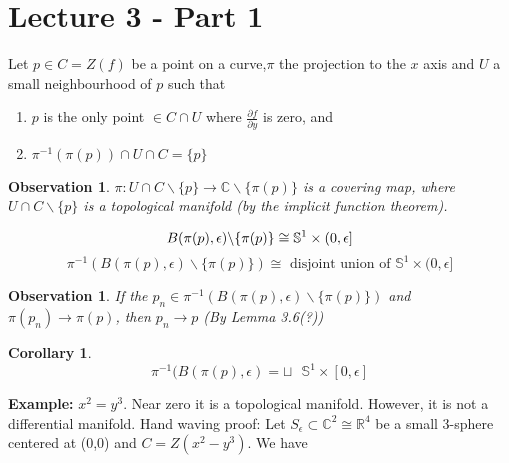 \documentclass[12pt]{article}
\newtheorem{corollary}[theorem]{Corollary}
\newtheorem{observation}[theorem]{Observation}
\theoremstyle{remark}
\begin{document}
\section{Lecture 3 - Part 1}

Let $p\in C=Z(f)$ be a point on a curve,$\pi$ the projection to the $x$ axis and $U$ a small neighbourhood of $p$ such that

\begin{enumerate}

    \item $p$ is  the only point $\in C\cap U$ where $\frac{\partial f}{\partial y}$ is zero, and

    \item $\pi^{-1}(\pi (p))\cap U\cap C = \{p\}$

\end{enumerate}

\begin{observation}

$\pi: U\cap C\backslash \{p\}\rightarrow \mathbb{C}\backslash \{\pi(p)\} $ is a covering map, where $U\cap C\backslash \{p\}$ is a topological manifold (by the implicit function theorem).

\end{observation}

\[
    B(\pi(p),\epsilon)\backslash\{\pi(p)\} \cong \mathbb{S}^1\times (0,\epsilon]\\
\]
\[
    \pi^{-1}(B(\pi(p),\epsilon)\backslash\{\pi(p)\}) \cong \text{ disjoint union of } \mathbb{S}^1\times (0,\epsilon] \]

\begin{observation}

If the $p_n\in \pi^{-1}(B(\pi(p),\epsilon)\backslash\{\pi(p)\})$ and $\pi(p_n)\rightarrow \pi(p)$, then $p_n\rightarrow p$ (By Lemma 3.6(?))

\end{observation}

\begin{corollary}

\[
    \pi^{-1}(B(\pi(p),\epsilon)=     \sqcup\text{ } \mathbb{S}^1\times [0,\epsilon]
    \]

\end{corollary}

\textbf{Example:} $x^2=y^3$. Near zero it is a topological manifold. However, it is not a differential manifold. Hand waving proof: Let $S_{\epsilon}\subset \mathbb{C}^2\cong \mathbb{R}^4$ be a small 3-sphere centered at (0,0) and  $C=Z(x^2-y^3)$. We have
\end{document}
